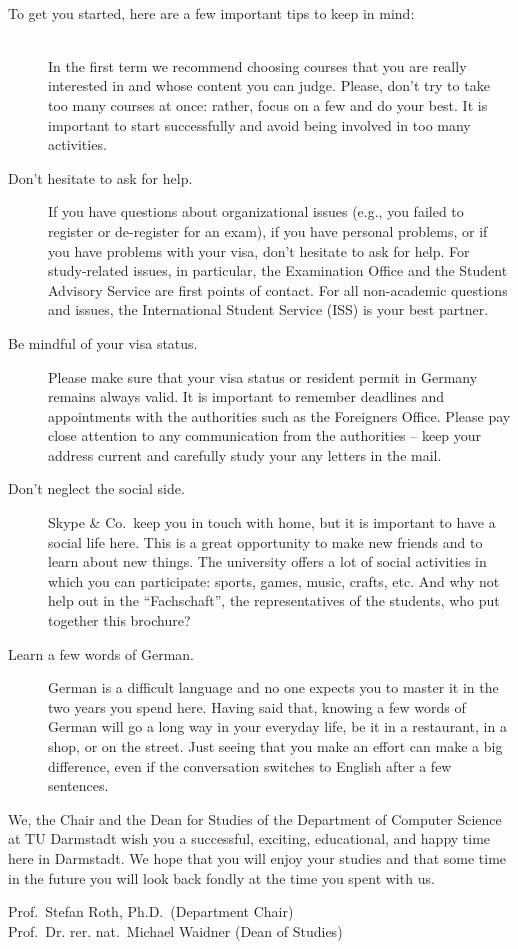 {  \

  To get you started, here are a few important tips to keep in mind:
  \\ \\
  \begin{description}
    \item[\parbox{\textwidth}{Be focused in your studies, but not over- \\
    ambitious.}]
      In the first term we recommend choosing courses that you are really interested in and whose content you can judge.
      Please, don't try to take too many courses at once: rather, focus on a few and do your best.
      It is important to start successfully and avoid being involved in too many activities.
    \item[Don't hesitate to ask for help.]
      If you have questions about organizational issues (e.g., you failed to register or de-register for an exam), if you have personal problems, or if you have problems with your visa, don't hesitate to ask for help.
      For study-related issues, in particular, the Examination Office and the Student Advisory Service are first points of contact.
      For all non-academic questions and issues, the International Student Service (ISS) is your best partner.
    \item[Be mindful of your visa status.]
      Please make sure that your visa status or resident permit in Germany remains always valid.
      It is important to remember deadlines and appointments with the authorities such as the Foreigners Office.
      Please pay close attention to any communication from the authorities -- keep your address current and carefully study your any letters in the mail.
    \item[Don't neglect the social side.]
      Skype \& Co.\ keep you in touch with home, but it is important to have a social life here.
      This is a great opportunity to make new friends and to learn about new things.
      The university offers a lot of social activities in which you can participate: sports, games, music, crafts, etc.
      And why not help out in the ``Fachschaft'', the representatives of the students, who put together this brochure?
    \item[Learn a few words of German.]
      German is a difficult language and no one expects you to master it in the two years you spend here.
      Having said that, knowing a few words of German will go a long way in your everyday life, be it in a restaurant, in a shop, or on the street.
      Just seeing that you make an effort can make a big difference, even if the conversation switches to English after a few sentences.
  \end{description}

  We, the Chair and the Dean for Studies of the Department of Computer Science at TU Darmstadt wish you a successful, exciting, educational, and happy time here in Darmstadt.
  We hope that you will enjoy your studies and that some time in the future you will look back fondly at the time you spent with us.

}{Prof.~Stefan Roth, Ph.D.~(Department Chair)\\ Prof.~Dr. rer. nat.~Michael Waidner (Dean of Studies)}
